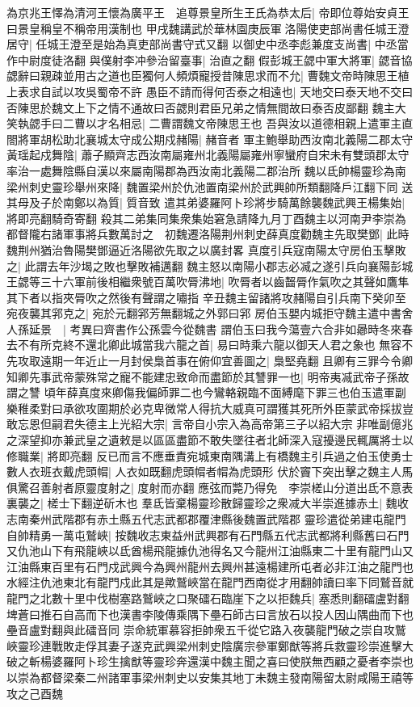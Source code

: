 為京兆王懌為清河王懷為廣平王　追尊景皇所生王氏為恭太后|{
	帝即位尊始安貞王曰景皇稱皇不稱帝用漢制也}
甲戌魏講武於華林園庚辰軍洛陽使吏部尚書任城王澄居守|{
	任城王澄至是始為真吏部尚書守式又翻}
以御史中丞李彪兼度支尚書|{
	中丞當作中尉度徒洛翻}
與僕射李冲參治留臺事|{
	治直之翻}
假彭城王勰中軍大將軍|{
	勰音協}
勰辭曰親疎並用古之道也臣獨何人頻煩寵授昔陳思求而不允|{
	曹魏文帝時陳思王植上表求自試以攻吳蜀帝不許}
愚臣不請而得何否泰之相遠也|{
	天地交曰泰天地不交曰否陳思於魏文上下之情不通故曰否勰則君臣兄弟之情無間故曰泰否皮鄙翻}
魏主大笑執勰手曰二曹以才名相忌|{
	二曹謂魏文帝陳思王也}
吾與汝以道德相親上遣軍主直閤將軍胡松助北襄城太守成公期戍赭陽|{
	赭音者}
軍主鮑舉助西汝南北義陽二郡太守黃瑶起戍舞陰|{
	蕭子顯齊志西汝南屬雍州北義陽屬雍州寧蠻府自宋未有雙頭郡太守率治一處舞陰縣自漢以來屬南陽郡為西汝南北義陽二郡治所}
魏以氐帥楊靈珍為南梁州刺史靈珍舉州來降|{
	魏置梁州於仇池置南梁州於武興帥所類翻降戶江翻下同}
送其母及子於南鄭以為質|{
	質音致}
遣其弟婆羅阿卜珍將步騎萬餘襲魏武興王楊集始|{
	將即亮翻騎奇寄翻}
殺其二弟集同集衆集始窘急請降九月丁酉魏主以河南尹李崇為都督隴右諸軍事將兵數萬討之　初魏遷洛陽荆州刺史薛真度勸魏主先取樊鄧|{
	此時魏荆州猶治魯陽樊鄧逼近洛陽欲先取之以廣封畧}
真度引兵寇南陽太守房伯玉擊敗之|{
	此謂去年沙堨之敗也擊敗補邁翻}
魏主怒以南陽小郡志必㓕之遂引兵向襄陽彭城王勰等三十六軍前後相繼衆號百萬吹脣沸地|{
	吹脣者以齒齧脣作氣吹之其聲如鷹隼其下者以指夾脣吹之然後有聲謂之嘯指}
辛丑魏主留諸將攻赭陽自引兵南下癸卯至宛夜襲其郛克之|{
	宛於元翻郛芳無翻城之外郭曰郛}
房伯玉嬰内城拒守魏主遣中書舍人孫延景　|{
	考異曰齊書作公孫雲今從魏書}
謂伯玉曰我今蕩壹六合非如曏時冬來春去不有所克終不還北卿此城當我六龍之首|{
	易曰時乘六龍以御天人君之象也}
無容不先攻取遠期一年近止一月封侯梟首事在俯仰宜善圖之|{
	梟堅堯翻}
且卿有三罪今令卿知卿先事武帝蒙殊常之寵不能建忠致命而盡節於其讐罪一也|{
	明帝夷㓕武帝子孫故謂之讐}
頃年薛真度來卿傷我偏師罪二也今鸞輅親臨不面縛麾下罪三也伯玉遣軍副樂稚柔對曰承欲攻圍期於必克卑微常人得抗大威真可謂獲其死所外臣蒙武帝採拔豈敢忘恩但嗣君失德主上光紹大宗|{
	言帝自小宗入為高帝第三子以紹大宗}
非唯副億兆之深望抑亦兼武皇之遺敕是以區區盡節不敢失墜往者北師深入寇擾邊民輒厲將士以修職業|{
	將即亮翻}
反已而言不應垂責宛城東南隅溝上有橋魏主引兵過之伯玉使勇士數人衣班衣戴虎頭㡌|{
	人衣如既翻虎頭㡌者㡌為虎頭形}
伏於竇下突出擊之魏主人馬俱驚召善射者原靈度射之|{
	度射而亦翻}
應弦而斃乃得免　李崇槎山分道出氐不意表裏襲之|{
	槎士下翻逆斫木也}
羣氐皆棄楊靈珍散歸靈珍之衆减大半崇進據赤土|{
	魏收志南秦州武階郡有赤土縣五代志武都郡覆津縣後魏置武階郡}
靈珍遣從弟建屯龍門自帥精勇一萬屯鷲峽|{
	按魏收志東益州武興郡有石門縣五代志武都將利縣舊曰石門又仇池山下有飛龍峽以氐酋楊飛龍據仇池得名又今龍州江油縣東二十里有龍門山又江油縣東百里有石門戍武興今為興州龍州去興州甚遠楊建所屯者必非江油之龍門也水經注仇池東北有龍門戍此其是歟鷲峽當在龍門西南從才用翻帥讀曰率下同鷲音就}
龍門之北數十里中伐樹塞路鷲峽之口聚礌石臨崖下之以拒魏兵|{
	塞悉則翻礌盧對翻埤蒼曰推石自高而下也漢書李陵傳乘隅下壘石師古曰言放石以投人因山隅曲而下也壘音盧對翻與此礌音同}
崇命統軍慕容拒帥衆五千從它路入夜襲龍門破之崇自攻鷲峽靈珍連戰敗走俘其妻子遂克武興梁州刺史陰廣宗參軍鄭猷等將兵救靈珍崇進擊大破之斬楊婆羅阿卜珍生擒猷等靈珍奔還漢中魏主聞之喜曰使朕無西顧之憂者李崇也以崇為都督梁秦二州諸軍事梁州刺史以安集其地丁未魏主發南陽留太尉咸陽王禧等攻之己酉魏

